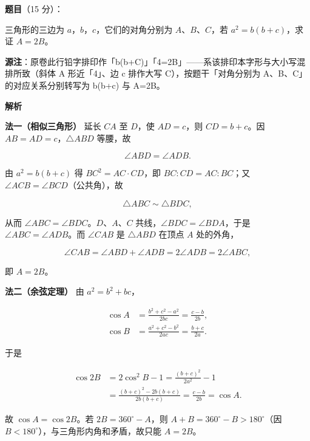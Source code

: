 \begin{answer}

\textbf{题目}（15 分）：

三角形的三边为 $a$，$b$，$c$，它们的对角分别为 $A$、$B$、$C$，若 $a^2=b(b+c)$，求证 $A=2B$。

\begin{gktip}
\textbf{源注}：原卷此行铅字排印作「b(b+C)」「4=2B」——系该排印本字形与大小写混排所致（斜体 A 形近「4」、边 c 排作大写 C），按题干「对角分别为 A、B、C」的对应关系分别转写为 b(b+c) 与 A=2B。
\end{gktip}

\textbf{解析}

\textbf{法一（相似三角形）} 延长 $CA$ 至 $D$，使 $AD=c$，则 $CD=b+c$。因 $AB=AD=c$，$\triangle ABD$ 等腰，故

\nopagebreak[4]
\[
\angle ABD=\angle ADB.
\]

由 $a^2=b(b+c)$ 得 $BC^2=AC\cdot CD$，即 $BC:CD=AC:BC$；又 $\angle ACB=\angle BCD$（公共角），故

\nopagebreak[4]
\[
\triangle ABC\sim\triangle BDC,
\]

从而 $\angle ABC=\angle BDC$。$D$、$A$、$C$ 共线，$\angle BDC=\angle BDA$，于是 $\angle ABC=\angle ADB$。而 $\angle CAB$ 是 $\triangle ABD$ 在顶点 $A$ 处的外角，

\nopagebreak[4]
\[
\angle CAB=\angle ABD+\angle ADB=2\angle ADB=2\angle ABC,
\]

即 $A=2B$。

\textbf{法二（余弦定理）} 由 $a^2=b^2+bc$，

\nopagebreak[4]
\[
\begin{aligned}
\cos A&=\frac{b^2+c^2-a^2}{2bc}
=\frac{c-b}{2b},\\
\cos B&=\frac{a^2+c^2-b^2}{2ac}
=\frac{b+c}{2a}.
\end{aligned}
\]

于是

\nopagebreak[4]
\[
\begin{aligned}
\cos 2B&=2\cos^2B-1
=\frac{(b+c)^2}{2a^2}-1\\
&=\frac{(b+c)^2-2b(b+c)}{2b(b+c)}
=\frac{c-b}{2b}=\cos A.
\end{aligned}
\]

故 $\cos A=\cos 2B$。若 $2B=360^\circ-A$，则 $A+B=360^\circ-B>180^\circ$（因 $B<180^\circ$），与三角形内角和矛盾，故只能 $A=2B$。


\end{answer}
